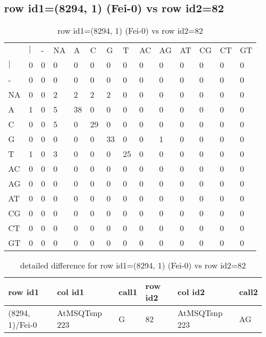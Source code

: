 \subsection{row id1=(8294, 1) (Fei-0) vs row id2=82}
\begin{center}
\begin{longtable}{|l|l|l|l|l|l|l|l|l|l|l|l|l|l|}
\caption{row id1=(8294, 1) (Fei-0) vs row id2=82} \label{table_dm266}\\
\hline
\\
\hline
&$|$&-&NA&A&C&G&T&AC&AG&AT&CG&CT&GT\\
$|$&0&0&0&0&0&0&0&0&0&0&0&0&0\\
-&0&0&0&0&0&0&0&0&0&0&0&0&0\\
NA&0&0&2&2&2&2&0&0&0&0&0&0&0\\
A&1&0&5&38&0&0&0&0&0&0&0&0&0\\
C&0&0&5&0&29&0&0&0&0&0&0&0&0\\
G&0&0&0&0&0&33&0&0&1&0&0&0&0\\
T&1&0&3&0&0&0&25&0&0&0&0&0&0\\
AC&0&0&0&0&0&0&0&0&0&0&0&0&0\\
AG&0&0&0&0&0&0&0&0&0&0&0&0&0\\
AT&0&0&0&0&0&0&0&0&0&0&0&0&0\\
CG&0&0&0&0&0&0&0&0&0&0&0&0&0\\
CT&0&0&0&0&0&0&0&0&0&0&0&0&0\\
GT&0&0&0&0&0&0&0&0&0&0&0&0&0\\
\hline
\end{longtable}
\end{center}

\begin{center}
\begin{longtable}{|l|l|l|l|l|l|}
\caption{detailed difference for row id1=(8294, 1) (Fei-0) vs row id2=82} \label{table_dm267}\\
\hline
row id1&col id1&call1&row id2&col id2&call2\\
\hline
(8294, 1)/Fei-0&AtMSQTsnp 223&G&82&AtMSQTsnp 223&AG\\
\hline
\end{longtable}
\end{center}

